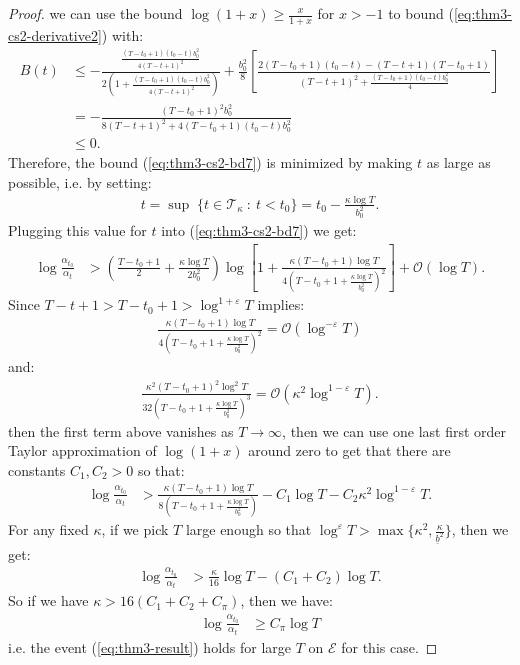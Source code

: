 \begin{proof}
we can use the bound $\log (1+x) \geq \frac{x}{1+x}$ for $x > -1$ to bound (\ref{eq:thm3-cs2-derivative2}) with:
\begin{align*}
    B(t) &\leq -\frac{\frac{(T-t_0+1)(t_0-t)b_0^2}{4(T-t+1)^2}}{2\left(1 +\frac{(T-t_0+1)(t_0-t)b_0^2}{4(T-t+1)^2} \right)} + \frac{b_0^2}{8}\left[\frac{2(T-t_0+1)(t_0-t)-(T-t+1)(T-t_0+1)}{(T-t+1)^2 +\frac{(T-t_0+1)(t_0-t)b_0^2}{4}}\right] \\
    &= -\frac{(T-t_0+1)^2b_0^2}{8(T-t+1)^2 +4(T-t_0+1)(t_0-t)b_0^2} \\
    &\leq 0.
\end{align*}
Therefore, the bound (\ref{eq:thm3-cs2-bd7}) is minimized by making $t$ as large as possible, i.e. by setting: 
\begin{align*}
    t = \sup\;\{t \in \mathcal{T}_{\kappa} \::\: t< t_0\} = t_0 - \frac{\kappa \log T}{b_0^2} \tag{$s_0^2 = 1 \implies f_1(s_0^2) = f_1(s_0^2) =0$}. 
\end{align*}
Plugging this value for $t$ into  (\ref{eq:thm3-cs2-bd7}) we get:
\begin{align}
    \log \frac{\alpha_{t_0}}{\alpha_t} &> \left(\frac{T - t_0 +1}{2} + \frac{\kappa \log T}{2b_0^2}\right)\log\left[1 + \frac{\kappa(T-t_0+1)\log T}{4\left(T-t_0+1 + \frac{\kappa\log T}{b_0^2}\right)^2} \right]+ \mathcal{O}(\log T). \label{eq:thm3-cs2-bd8}
\end{align}
Since $T-t+1 > T-t_0+1 > \log^{1+\varepsilon} T$ implies:
\begin{align*}
    \frac{\kappa(T-t_0+1)\log T}{4\left(T-t_0+1 + \frac{\kappa\log T}{b_0^2}\right)^2} = \mathcal{O}(\log^{-\varepsilon} T)
\end{align*}
and:
\begin{align*}
    \frac{\kappa^2(T-t_0+1)^2\log^2 T}{32\left(T-t_0+1 + \frac{\kappa\log T}{b_0^2}\right)^3} = \mathcal{O}(\kappa^2 \log^{1-\varepsilon} T).
\end{align*}
then the first term above vanishes as $T\to\infty$, then we can use one last first order Taylor approximation of $\log(1+x)$ around zero to get that there are constants $C_1,C_2>0$ so that: 
\begin{align*}
    \log \frac{\alpha_{t_0}}{\alpha_t} &> \frac{\kappa(T-t_0+1)\log T}{8\left(T-t_0+1 + \frac{\kappa\log T}{b_0^2}\right)}- C_1\log T - C_2 \kappa^2\log^{1-\varepsilon} T.
\end{align*}
For any fixed $\kappa$, if we pick $T$ large enough so that $\log^\varepsilon T > \max\{\kappa^2, \frac{\kappa}{\underline{b}^2}\}$, then we get:
\begin{align*}
    \log \frac{\alpha_{t_0}}{\alpha_t} &> \frac{\kappa}{16}\log T - (C_1 + C_2)\log T.
\end{align*}
So if we have $\kappa > 16 (C_1 + C_2+ C_\pi)$, then we have:
\begin{align*}
    \log \frac{\alpha_{t_0}}{\alpha_t} &\geq C_\pi \log T
\end{align*}
i.e. the event (\ref{eq:thm3-result}) holds for large $T$ on $\mathcal{E}$ for this case.

\end{proof}
